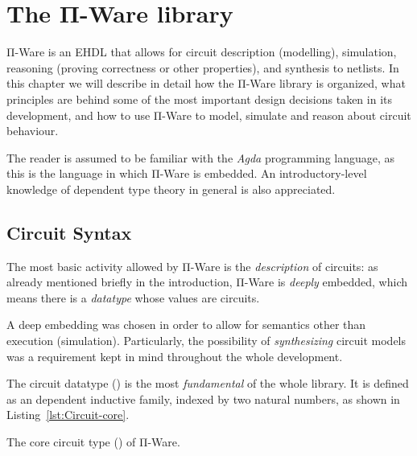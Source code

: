 \chapter{The Π-Ware library}
\label{chap:piware}

    Π-Ware is an \ac{EHDL} that allows for circuit description (modelling),
    simulation, reasoning (proving correctness or other properties), and synthesis to netlists.
    In this chapter we will describe in detail how the Π-Ware library is organized,
    what principles are behind some of the most important design decisions taken in its development,
    and how to use Π-Ware to model, simulate and reason about circuit behaviour.

    The reader is assumed to be familiar with the \emph{Agda} programming language,
    as this is the language in which Π-Ware is embedded.
    An introductory-level knowledge of dependent type theory in general is also appreciated.


    \section{Circuit Syntax}
    \label{sec:circuit-syntax}

        The most basic activity allowed by Π-Ware is the \emph{description} of circuits:
        as already mentioned briefly in the introduction, Π-Ware is \emph{deeply} embedded,
        which means there is a \emph{datatype} whose values are circuits.

        A deep embedding was chosen in order to allow for semantics other than execution (simulation).
        Particularly, the possibility of \emph{synthesizing} circuit models was a requirement
        kept in mind throughout the whole development.

        The circuit datatype () is the most \emph{fundamental} of the whole library.
        It is defined as an dependent inductive family, indexed by two natural numbers,
        as shown in Listing~\ref{lst:Circuit-core}.

        \begin{listing}[h]
            \caption{The core circuit type () of Π-Ware. \label{lst:Circuit-core}}
        \end{listing}


